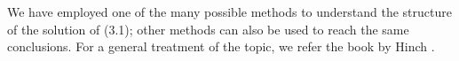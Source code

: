 \documentclass[12pt]{report}   %
\newcommand{\Ndg}{\tilde{N}_g}
\begin{document}
% 
% 
We have employed one of the many possible methods to understand the structure of the solution of (3.1); other methods can also be used to reach the same conclusions.
For a general treatment of the topic, we refer the book by Hinch \cite{Hinch1991}. %

%
\clearpage{\pagestyle{empty}\cleardoublepage}

%


\begin{spacing}{0.9}
  
\end{spacing}
\end{document}
